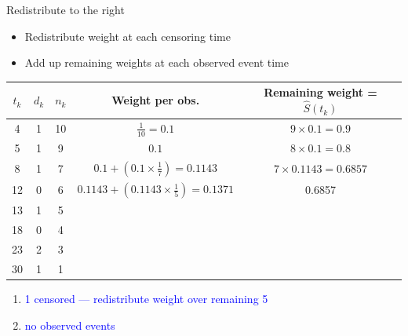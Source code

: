\documentclass[10pt,t]{beamer}
\begin{document}
\begin{frame}{Redistribute to the right}
	
\vspace{-5 mm}	
	
	\begin{itemize}
		\item Redistribute weight at each censoring time
		
		\medskip
		
		\item Add up remaining weights at each observed event time
	\end{itemize}

\smallskip

	\begin{footnotesize}
		\begin{center}
		\begin{tabular}{|c|c|c|c|c|}
			\hline
			$t_k$ & $d_k$ & $n_k$ & Weight per obs. & Remaining weight = $\widehat{S}(t_k)$ \\
			\hline
			4 & 1 & 10 & $\frac{1}{10} = 0.1$ & $9\times 0.1= 0.9$\\
			5 & 1 & 9 & $0.1$ &  $8\times 0.1= 0.8$  \\
			8 & 1 & 7 & $0.1 + (0.1\times \frac{1}{7}) = 0.1143$ & $7 \times 0.1143 = 0.6857$\\
			12 & 0 & 6 & $0.1143 +  (0.1143\times\frac{1}{5}) = 0.1371$ &  0.6857\\
			13 & 1 & 5 & & \\
			18 & 0 & 4 & & \\
			23 & 2 & 3 & & \\
			30 & 1 & 1 & & \\
			\hline
		\end{tabular}
	\end{center}
	\end{footnotesize}

\medskip
	\begin{enumerate}
		\item \textcolor{blue}{1 censored --- redistribute weight over remaining 5}
		
		\medskip
		
		\item \textcolor{blue}{no observed events}
	\end{enumerate}
\end{frame}
\end{document}
